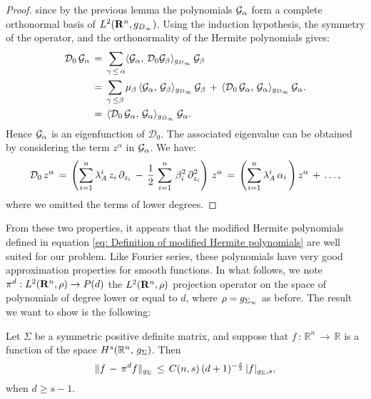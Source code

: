 \begin{proof}
    since by the previous lemma the polynomials $\mathcal G_{\alpha}$ form a
    complete orthonormal basis of $L^2(\mathbf R^n, g_{D_\infty})$.  Using the
    induction hypothesis, the symmetry of the operator, and the orthonormality
    of the Hermite polynomials gives:
    \begin{equation*}
        \begin{aligned}
            \mathcal D_0 \, \mathcal G_{\alpha}\,&=\, \sum_{\gamma\, \leq \, \alpha} \langle \mathcal
            G_{\alpha},\, \mathcal D_0 \mathcal G_{\beta}\rangle_{g_{D_\infty}}\, \mathcal G_{\beta} \\
            \,&=\, \sum_{\gamma\, \leq \beta} \mu_{\beta}\, \langle \mathcal G_{\alpha}, \,
            \mathcal G_{\beta}\rangle_{g_{D_\infty}}\, \mathcal G_{\beta}\,+\, \langle \mathcal D_0\,\mathcal
            G_{\alpha},\, \mathcal G_{\alpha}\rangle_{g_{D_\infty}} \, \mathcal G_{\alpha}.\\
            &= \, \langle \mathcal D_0\,\mathcal
            G_{\alpha},\, \mathcal G_{\alpha}\rangle_{g_{D_\infty}} \, \mathcal G_{\alpha}.
        \end{aligned}
    \end{equation*}
    Hence $\mathcal G_\alpha$ is an eigenfunction of $\mathcal D_0$. The associated
    eigenvalue can be obtained by considering the term $z^{\alpha}$ in
    $\mathcal G_{\alpha}$. We have:
    $$
    \mathcal D_0\, z^{\alpha}\,=\,  \left(\sum^{n}_{i=1} \lambda_A^i \, z_i \, \partial_{z_i}  \,-\,\frac12
        \,\sum^n_{i=1} \,{\beta}_i^2\, \partial_{z_i}^2 \right)\, z^{\alpha} \,=\, \left(\sum^{n}_{i=1} \lambda_A^i \, \alpha_i \,
        \right)z^\alpha\,+\, \dots,
    $$
    where we omitted the terms of lower degrees.
\end{proof} \fi
From these two properties, it appears that the modified Hermite polynomials
defined in equation \eqref{eq: Definition of modified Hermite polynomials} are
well suited for our problem. Like Fourier series, these polynomials have very
good approximation properties for smooth functions. In what follows, we note
$\pi^d: L^2(\mathbf R^n, \rho) \rightarrow P(d)$ the $L^2(\mathbf R^n,\rho)$ projection
operator on the space of polynomials of degree lower or equal to $d$, where
$\rho = g_{\Sigma_\infty}$ as before. The result we want to show is the
following:
\begin{proposition}
    Let $\Sigma$ be a symmetric positive definite matrix, and suppose that
    $f\,:\,\mathbb R^n\,\to\,\mathbb R$ is a function of the space $H^s(\mathbb
    R^n,\,g_{\Sigma})$. Then
    $$
        \|f\,-\,{\pi}^df\|_{g_{\Sigma}}\, \leq \,C(n,s) \, (d+1)^{-\frac{s}{2}}\, |f|_{g_{\Sigma},s},
    $$
    when $d \geq s-1$.
    \label{proposition: approx Hermite}
\end{proposition}
